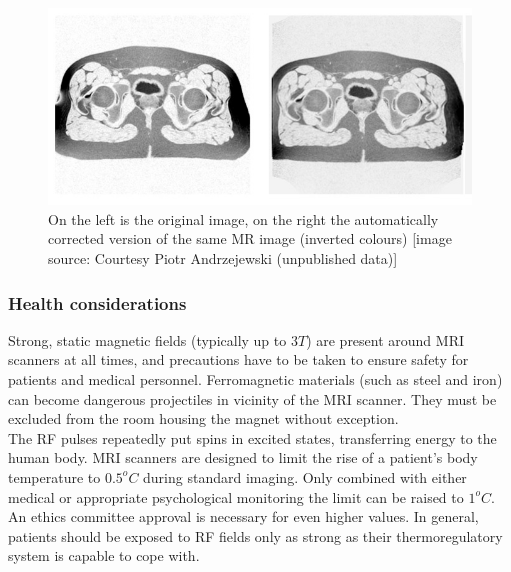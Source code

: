 \begin{figure}[h!]
\centering
\includegraphics[width=\linewidth]{../fig/vgl-corr_inverse.jpg}
\caption{On the left is the original image, on the right the automatically corrected version of the same MR image (inverted colours) [image source: Courtesy Piotr Andrzejewski (unpublished data)]}
\label{fig:dist_compare}
\end{figure}



\subsubsection{Health considerations}

Strong, static magnetic fields (typically up to $3T$) are present around MRI scanners at all times, and precautions have to be taken to ensure safety for patients and medical personnel.
Ferromagnetic materials (such as steel and iron) can become dangerous projectiles in vicinity of the MRI scanner.
They must be excluded from the room housing the magnet without exception.\\


The RF pulses repeatedly put spins in excited states, transferring energy to the human body.
MRI scanners are designed to limit the rise of a patient's body temperature to $0.5^oC$ during standard imaging.
Only combined with either medical or appropriate psychological monitoring the limit can be raised to $1^oC$.
An ethics committee approval is necessary for even higher values.
In general, patients should be exposed to RF fields only as strong as their thermoregulatory system is capable to cope with.\\

